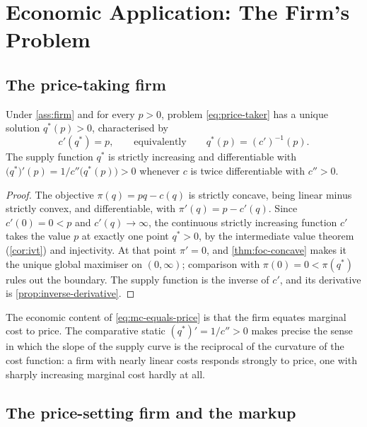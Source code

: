 \section{Economic Application: The Firm's Problem}\label{sec:c1-firm}

\subsection{The price-taking firm}

\begin{proposition}\label{prop:price-taker}
	Under \autoref{ass:firm} and for every $p>0$, problem \eqref{eq:price-taker}
	has a unique solution $q^\ast(p)>0$, characterised by
	\begin{equation}\label{eq:mc-equals-price}
		c'(q^\ast)=p,\qquad\text{equivalently}\qquad q^\ast(p)=(c')^{-1}(p).
	\end{equation}
	The supply function $q^\ast$ is strictly increasing and differentiable with
	$\bigl(q^\ast\bigr)'(p)=1/c''\bigl(q^\ast(p)\bigr)>0$ whenever $c$ is twice
	differentiable with $c''>0$.
\end{proposition}

\begin{proof}
	The objective $\pi(q)=pq-c(q)$ is strictly concave, being linear minus strictly
	convex, and differentiable, with $\pi'(q)=p-c'(q)$. Since $c'(0)=0<p$ and
	$c'(q)\to\infty$, the continuous strictly increasing function $c'$ takes the
	value $p$ at exactly one point $q^\ast>0$, by the intermediate value theorem
	(\autoref{cor:ivt}) and injectivity. At that point $\pi'=0$, and
	\autoref{thm:foc-concave} makes it the unique global maximiser on $(0,\infty)$;
	comparison with $\pi(0)=0<\pi(q^\ast)$ rules out the boundary. The supply
	function is the inverse of $c'$, and its derivative is
	\autoref{prop:inverse-derivative}.
\end{proof}

The economic content of \eqref{eq:mc-equals-price} is that the firm equates
marginal cost to price. The comparative static
$(q^\ast)'=1/c''>0$ makes precise the sense in which the slope of the supply
curve is the reciprocal of the curvature of the cost function: a firm with nearly
linear costs responds strongly to price, one with sharply increasing marginal
cost hardly at all.

\subsection{The price-setting firm and the markup}


